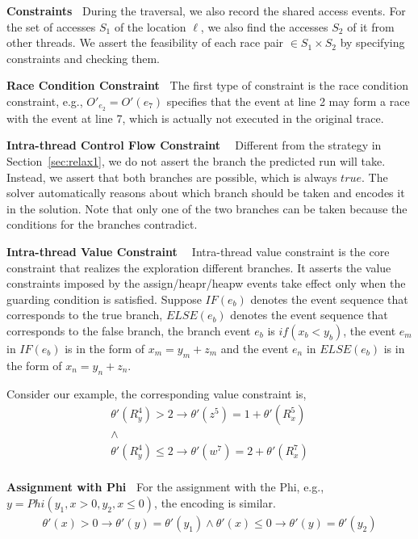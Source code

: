 {\bf Constraints\ } During the traversal, we also record the shared access events.  For the set of accesses $S_1$ of the location $\ell$, we also find the accesses $S_2$ of it from other threads. We assert the feasibility of each race pair $\in S_1 \times S_2$ by specifying constraints and checking them.

{\bf Race Condition Constraint\ }  The first type of constraint is the race condition constraint, e.g., $O'_{e_2}=O'(e_7)$ specifies that the event at line 2 may form a race with the event at line 7, which is actually not executed in the original trace.

{\bf Intra-thread Control Flow Constraint \ } Different from the strategy in Section~\ref{sec:relax1}, we do not assert the branch the predicted run will take. Instead, we assert that both branches are possible, which is always $true$. The solver automatically reasons about which branch should be taken and encodes it in the solution. Note that only one of the two branches can be taken because the conditions for the branches contradict.

{\bf Intra-thread Value Constraint \ } Intra-thread value constraint is the core constraint that realizes the exploration different branches. It asserts the value constraints imposed by the {\sf assign/heapr/heapw} events take effect only when the guarding condition is satisfied. 
Suppose $IF(e_b)$ denotes the event sequence that corresponds to the true branch, $ELSE(e_b)$ denotes the event sequence that corresponds to the false branch, the branch event $e_b$ is  $if(x_b<y_b)$, the event $e_m$ in $IF(e_b)$ is in the form of $x_m=y_m+z_m$ and the event $e_n$ in $ELSE(e_b)$ is in the form of $x_n=y_n+z_n$.




Consider our example, the corresponding value constraint is, 
$$
\begin{array}{l}
\theta'(R^4_y)>2 \rightarrow \theta'(z^5)=1+\theta'(R^5_x) \\ 
\wedge  \\
\theta'(R^4_y)\leq 2 \rightarrow  \theta'(w^7)=2+\theta'(R^{7}_{x})\\
\end{array}
$$

{\bf Assignment with {\sf Phi}\ }  For the assignment with the Phi, e.g., $y=Phi(y_1, x>0, y_2, x\leq 0)$, the encoding is similar.
$$
\begin{array}{l}
\theta'(x)>0 \rightarrow \theta'(y)=\theta'(y_1) \wedge \theta'(x)\leq 0 \rightarrow \theta'(y)=\theta'(y_2)
\end{array}
$$

